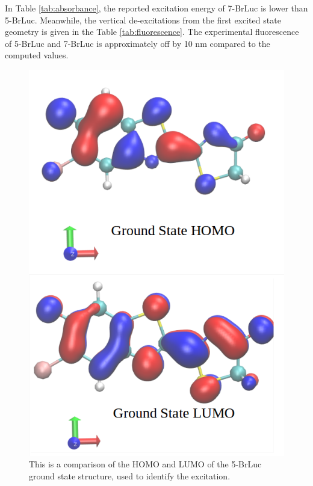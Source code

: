 \documentclass[11pt]{article}
\begin{document}
In Table \ref{tab:absorbance}, the reported excitation energy
of 7-BrLuc is lower than 5-BrLuc. Meanwhile,
the vertical de-excitations from the first excited state geometry
is given in the Table \ref{tab:fluorescence}. The experimental
fluorescence of 5-BrLuc and
7-BrLuc\cite{doi:10.1002/cbic.201600564} is approximately off by
10 nm compared to the computed values.

\begin{figure}[H]
  \centering
  \includegraphics[scale=0.2]{compare_mos_5BrLuc.png}
  \caption{This is a comparison of the HOMO and LUMO of the
    5-BrLuc ground state structure, used to identify the
    excitation.}
  \label{fig:comp_5brLuc}
\end{figure}
\end{document}
